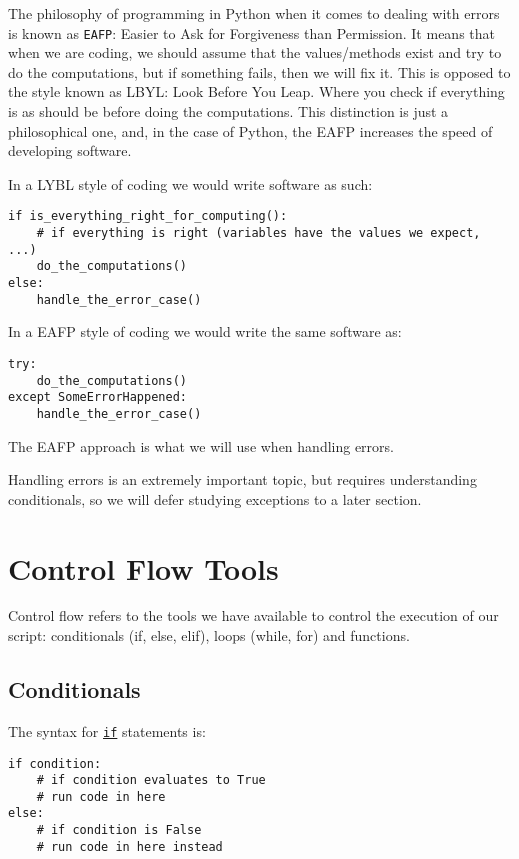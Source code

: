 \documentclass[12pt, a4paper]{article}
\begin{document}
The philosophy of programming in Python when it comes to dealing with errors is known as \texttt{EAFP}: Easier to Ask for Forgiveness than Permission.
It means that when we are coding, we should assume that the values/methods exist and try to do the computations, but if something fails, then we will fix it.
This is opposed to the style known as LBYL: Look Before You Leap.
Where you check if everything is as should be before doing the computations.
This distinction is just a philosophical one, and, in the case of Python, the EAFP increases the speed of developing software.

In a LYBL style of coding we would write software as such:
\lstset{language=jupyter-python,label= ,caption= ,captionpos=b,numbers=none}
\begin{lstlisting}
if is_everything_right_for_computing():
    # if everything is right (variables have the values we expect, ...)
    do_the_computations()
else:
    handle_the_error_case()
\end{lstlisting}

In a EAFP style of coding we would write the same software as:
\lstset{language=jupyter-python,label= ,caption= ,captionpos=b,numbers=none}
\begin{lstlisting}
try:
    do_the_computations()
except SomeErrorHappened:
    handle_the_error_case()
\end{lstlisting}
The EAFP approach is what we will use when handling errors.

Handling errors is an extremely important topic, but requires understanding conditionals, so we will defer studying exceptions to a later section.

\section{Control Flow Tools}
\label{sec:org513d3c1}
Control flow refers to the tools we have available to control the execution of our script: conditionals (if, else, elif), loops (while, for) and functions.
\subsection{Conditionals}
\label{sec:org7405560}
The syntax for \href{https://docs.python.org/3.6/tutorial/controlflow.html\#if-statements}{\texttt{if}} statements is:
\lstset{language=jupyter-python,label= ,caption= ,captionpos=b,numbers=none}
\begin{lstlisting}
if condition:
    # if condition evaluates to True
    # run code in here
else:
    # if condition is False
    # run code in here instead
\end{lstlisting}
\end{document}
